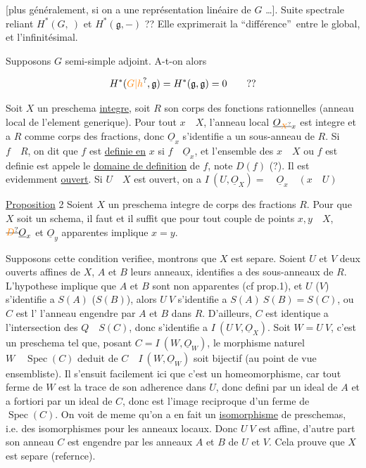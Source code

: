 [plus généralement, si on a une représentation linéaire de \(G\) \ldots]. Suite spectrale reliant \(H^*(G,\ )\) et \(H^*(\mathfrak g,-)\) ?? Elle exprimerait la \textquotedblleft différence\textquotedblright\ entre le global, et l'infinitésimal.

Supposons \(G\) semi-simple adjoint. A-t-on alors

\[
H^*(\unsure{G|h},\mathfrak g)=H^*(\mathfrak g,\mathfrak g)=0\qquad ??
\]

Soit \(X\) un preschema \uline{integre}, soit \(R\) son corps des fonctions rationnelles (anneau local de l'element generique). Pour tout \(x\quad X\),  l'anneau local \(\underline O_{\deleted{\unsure{X}}x}\) est integre et a \(R\) comme corps des fractions, donc \(\underline O_x\) s'identifie a un sous-anneau de \(R\). Si \(f\quad R\), on dit que \(f\) est \uline{definie en} \(x\) si \(f\quad\underline O_x\), et l'ensemble des \(x\quad X\) ou \(f\) est definie est appele le \uline{domaine de definition} de \(f\), note \(D(f)\) (?). Il est evidemment \uline{ouvert}. Si \(U\quad X\) est ouvert, on a \(I\ (U,\underline O_X)=\quad\underline O_x\quad(x\quad U)\)

\uline{Proposition} 2 Soient \(X\) un preschema integre de corps des fractions \(R\). Pour que \(X\) soit un schema, il faut et il suffit que pour tout couple de points \(x,y\quad X\), \(\deleted{\unsure{D}}\underline O_x\) et \(\underline O_y\) apparentes implique \(x=y\).

Supposons cette condition verifiee, montrons que \(X\) est separe. Soient \(U\) et \(V\) deux ouverts affines de \(X\), \(A\) et \(B\) leurs anneaux, identifies a des sous-anneaux de \(R\). L'hypothese implique que \(A\) et \(B\) sont non apparentes (cf prop.1),  et \(U\) (\(V\)) s'identifie a \(S(A)\) (\(S(B)\)), alors \(U\ V\) s'identifie a \(S(A)\ S(B)=S(C)\), ou \(C\) est l' l'anneau engendre par \(A\) et \(B\) dans \(R\). D'ailleurs, \(C\) est identique a l'intersection des \(Q\quad S(C)\), donc s'identifie a \(I\ (U\ V,\underline O_X)\). Soit \(W=U\ V\), c'est un preschema tel que, posant \(C=I\ (W,\underline O_W)\), le morphisme naturel \(W\quad\operatorname{Spec}(C)\) deduit de \(C\quad I\ (W,\underline O_W)\) soit bijectif (au point de vue ensembliste). Il s'ensuit facilement ici que c'est un homeomorphisme, car tout ferme de \(W\) est la trace de son adherence dans \(U\), donc defini par un ideal de \(A\) et a fortiori par un ideal de  \(C\), donc est l'image reciproque d'un ferme de \(\operatorname{Spec}(C)\). On voit de meme qu'on a en fait un \uline{isomorphisme} de preschemas, i.e. des isomorphismes pour les anneaux locaux. Donc \(U\ V\) est affine, d'autre part son anneau \(C\) est engendre par les anneaux \(A\) et \(B\) de \(U\) et \(V\). Cela prouve que \(X\) est separe (refernce).

